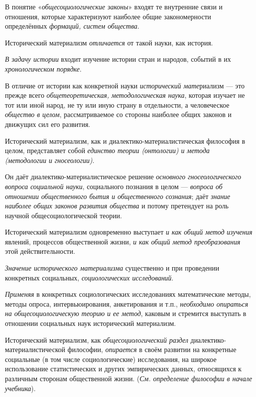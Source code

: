 \documentclass[a4paper,14pt,russian]{extreport}
\begin{document}
В понятие «\emph{общесоциологические законы}» входят те внутренние связи и отношения, которые характеризуют наиболее общие закономерности определённых \emph{формаций, систем общества}.

Исторический материализм \emph{отличается} от такой науки, как история.

\emph{В задачу истории} входит изучение истории стран и народов, событий в их \emph{хронологическом порядке}.

В отличие от истории как конкретной науки \emph{исторический мате}риализм --- это прежде всего \emph{общетеоретическая, методологическая наука}, которая изучает не тот или иной народ, не ту или иную страну в отдельности, а человеческое \emph{общество в целом}, рассматриваемое со стороны наиболее общих законов и движущих сил его развития.

Исторический материализм, как и диалектико-материалистическая философия в целом, представляет собой \emph{единство теории (онтологии) и метода (методологии и гносеологии)}.

Он даёт диалектико-материалистическое решение \emph{основного гносеологического вопроса социальной науки}, социального познания в целом --- \emph{вопроса об отношении общественного бытия и общественного сознания}; даёт \emph{знание наиболее общих законов развития общества} и потому претендует на роль научной общесоциологической теории.

Исторический материализм одновременно выступает \emph{и как общий метод} \emph{изучения} явлений, процессов общественной жизни, \emph{и как общий метод преобразования} этой действительности.

\emph{Значение исторического материализма} существенно и при проведении конкретных социальных, \emph{социологических исследований}.

\emph{Применяя} в конкретных социологических исследованиях математические методы, методы опроса, интервьюирования, анкетирования и т.п., \emph{необходимо опираться на общесоциологическую теорию и ее метод}, каковым и стремится выступать в отношении социальных наук исторический материализм.

Исторический материализм, как \emph{общесоциологический раздел} диалектико-материалистической философии, \emph{опирается} в своём развитии на конкретные социальные (в том числе социологические) исследования, на широкое использование статистических и других эмпирических данных, относящихся к различным сторонам общественной жизни. (\emph{См. определение философии в начале учебника}).
\end{document}
